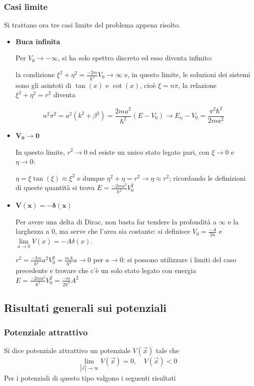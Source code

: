 \subsubsection{Casi limite}
Si trattano ora tre casi limite del problema appena risolto.
\begin{itemize}[leftmargin=*]
\item \textbf{Buca infinita}

Per $V_0\to-\infty$, si ha solo spettro discreto ed esso diventa infinito:

la condizione $\xi^2+\eta^2 = \frac{-2m}{\hbar^2}V_0\to\infty$ e, in questo limite, le soluzioni dei sistemi
sono gli asintoti di $\tan(x)$ e $\cot(x)$, cioè $\xi = n\pi$, la relazione $\xi^2+\eta^2=r^2$ diventa

    $$n^2\pi^2 = a^2(k^2+\beta^2)=\frac{2ma^2}{\hbar^2}(E-V_0) \to E_n-V_0 = \frac{\pi^2\hbar^2}{2ma^2}$$
\item $\mathbf{V_0\to0}$

    In questo limite, $r^2\to 0$ ed esiste un unico stato legato pari, con $\xi\to0$ e $\eta\to 0$:

    $\eta = \xi\tan(\xi)\approx\xi^2$ e dunque $\eta^2+\eta = r^2 \to \eta\approx r^2$; ricordando le 
    definizioni di queste quantità si trova $E = \frac{-2ma^2}{\hbar^2}V_0^2$
\item $\mathbf{V(x)=-\delta(x)}$

    Per avere una delta di Dirac, non basta far tendere la profondità a $\infty$ e la larghezza a 0, ma
    serve che l'area sia costante: si definisce $V_0 =\frac{-A}{2a}$ e
    $\lim\limits_{a\to0}V(x) = -A\delta(x)$.

    $r^2 = \frac{-2m}{\hbar^2}a^2V_0^2=\frac{mA}{\hbar^2}a\to0$ per $a\to 0$: si possono utilizzare i limiti
    del caso precedente e trovare che c'è un solo stato legato con energia
    $E = \frac{-2ma^2}{\hbar^2}V_0^2 = \frac{-m}{2\hbar^2}A^2$

\end{itemize}


\subsection{Risultati generali sui potenziali}
\subsubsection{Potenziale attrattivo}
Si dice potenziale attrattivo un potenziale $V(\vec{x})$ tale che
$$\lim\limits_{|\vec{x}|\to\infty}V(\vec{x}) = 0,\quad V(\vec{x})<0$$
Per i potenziali di questo tipo valgono i seguenti risultati

